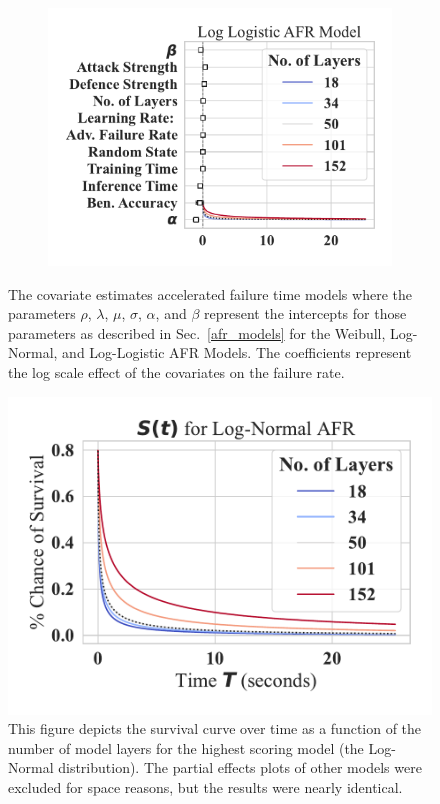 \begin{figure}
\begin{subfigure}{0.32\textwidth}
        \includegraphics[width=\textwidth]{cifar/log_logistic_aft.pdf}
    \end{subfigure}
    
    \caption{The covariate estimates accelerated failure time models where the parameters $\rho$, $\lambda$, $\mu$, $\sigma$, $\alpha$, and $\beta$ represent the intercepts for those parameters as described in Sec.~\ref{afr_models} for the Weibull, Log-Normal, and Log-Logistic AFR Models. The coefficients represent the log scale effect of the covariates on the failure rate.}
    \label{fig:afr_models}
\end{figure}

\begin{figure}
    \centering\includegraphics[width=.45\textwidth]{cifar/log_normal_partial_effects.pdf}
   \caption{This figure depicts the survival curve over time as a function of the number of model layers for the highest scoring model (the Log-Normal distribution). The partial effects plots of other models were excluded for space reasons, but the results were nearly identical.}
    \label{fig:layers}
\end{figure}

% 


